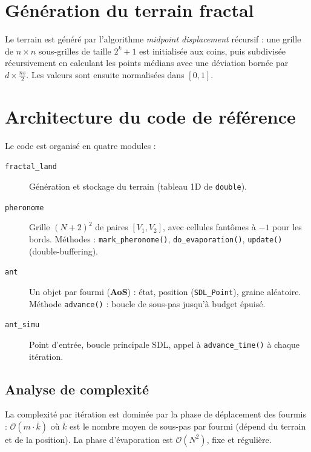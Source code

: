 \section{Génération du terrain fractal}

Le terrain est généré par l'algorithme \textit{midpoint displacement} récursif :
une grille de $n \times n$ sous-grilles de taille $2^k + 1$ est initialisée aux coins,
puis subdivisée récursivement en calculant les points médians avec une déviation bornée par
$d \times \frac{ns}{2}$. Les valeurs sont ensuite normalisées dans $[0, 1]$.


\section{Architecture du code de référence}

Le code est organisé en quatre modules :

\begin{description}
    \item[\texttt{fractal\_land}] Génération et stockage du terrain (tableau 1D de \texttt{double}).
    \item[\texttt{pheronome}] Grille $(N+2)^2$ de paires $[V_1, V_2]$, avec cellules fantômes
          à $-1$ pour les bords. Méthodes : \texttt{mark\_pheronome()}, \texttt{do\_evaporation()},
          \texttt{update()} (double-buffering).
    \item[\texttt{ant}] Un objet par fourmi (\textbf{AoS}) : état, position (\texttt{SDL\_Point}),
          graine aléatoire. Méthode \texttt{advance()} : boucle de sous-pas jusqu'à budget épuisé.
    \item[\texttt{ant\_simu}] Point d'entrée, boucle principale SDL, appel à
          \texttt{advance\_time()} à chaque itération.
\end{description}

\subsection{Analyse de complexité}

La complexité par itération est dominée par la phase de déplacement des fourmis :
$\mathcal{O}(m \cdot \bar{k})$ où $\bar{k}$ est le nombre moyen de sous-pas par fourmi
(dépend du terrain et de la position). La phase d'évaporation est $\mathcal{O}(N^2)$, fixe
et régulière.


